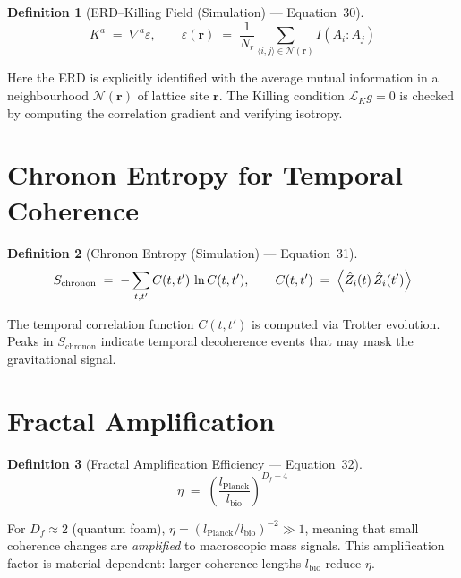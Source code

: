 \documentclass[11pt,a4paper]{article}
\newtheorem{definition}{Definition}[section]
\theoremstyle{remark}
\newcommand{\Lop}{\mathcal{L}}
\begin{document}
\begin{definition}[ERD--Killing Field (Simulation) --- Equation~30]
\begin{equation}\label{eq:erdsim}
    K^a \;=\; \nabla^a \varepsilon, \qquad
    \varepsilon(\mathbf{r}) \;=\; \frac{1}{N_r}\sum_{\langle i,j\rangle \in \mathcal{N}(\mathbf{r})}
        I(A_i : A_j)
\end{equation}
\end{definition}

Here the ERD is explicitly identified with the average mutual information in a neighbourhood $\mathcal{N}(\mathbf{r})$ of lattice site $\mathbf{r}$.  The Killing condition $\Lop_K g = 0$ is checked by computing the correlation gradient and verifying isotropy.

\section{Chronon Entropy for Temporal Coherence}
\label{sec:eq31}

\begin{definition}[Chronon Entropy (Simulation) --- Equation~31]
\begin{equation}\label{eq:chrononsim}
    S_{\text{chronon}} \;=\; -\sum_{t,t'} C(t,t')\,\ln C(t,t'), \qquad
    C(t,t') \;=\; \expval{\hat{Z}_i(t)\,\hat{Z}_i(t')}
\end{equation}
\end{definition}

The temporal correlation function $C(t,t')$ is computed via Trotter evolution.  Peaks in $S_{\text{chronon}}$ indicate temporal decoherence events that may mask the gravitational signal.

\section{Fractal Amplification}
\label{sec:eq32}

\begin{definition}[Fractal Amplification Efficiency --- Equation~32]
\begin{equation}\label{eq:fractalamp}
    \eta \;=\; \left(\frac{l_{\text{Planck}}}{l_{\text{bio}}}\right)^{\!D_f - 4}
\end{equation}
\end{definition}

For $D_f \approx 2$ (quantum foam), $\eta = (l_{\text{Planck}}/l_{\text{bio}})^{-2} \gg 1$, meaning that small coherence changes are \emph{amplified} to macroscopic mass signals.  This amplification factor is material-dependent: larger coherence lengths $l_{\text{bio}}$ reduce $\eta$.
\end{document}
